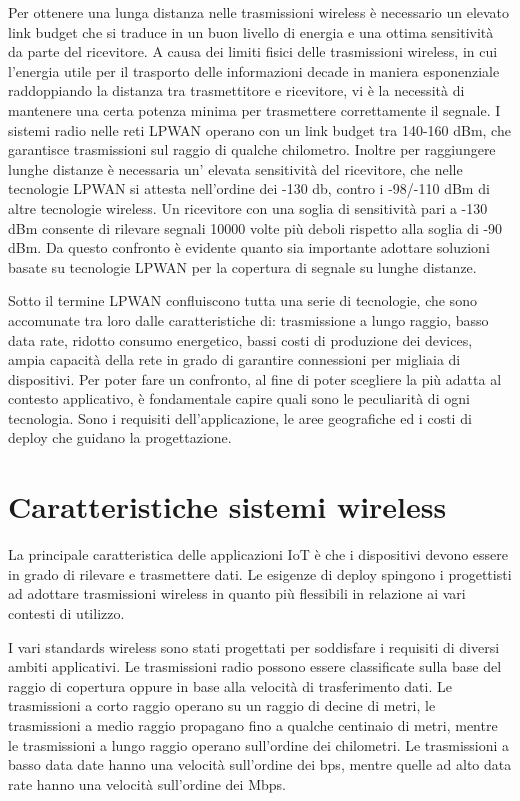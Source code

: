 \documentclass[12pt,a4paper,openright,twoside]{report}
\begin{document}
Per ottenere una lunga distanza nelle trasmissioni wireless \`e necessario un elevato link budget che si traduce in un buon livello di energia e una ottima sensitivit\`a da parte del ricevitore. 
A causa dei limiti fisici delle trasmissioni wireless, in cui l'energia utile per il trasporto delle informazioni decade in maniera esponenziale raddoppiando la distanza tra trasmettitore e ricevitore, vi \`e la necessit\`a di mantenere una certa potenza minima per trasmettere correttamente il segnale. 
I sistemi radio nelle reti LPWAN operano con un link budget tra 140-160 dBm, che garantisce trasmissioni sul raggio di qualche chilometro.
Inoltre per raggiungere lunghe distanze \`e necessaria un' elevata sensitivit\`a del ricevitore, che nelle tecnologie LPWAN si attesta nell'ordine dei -130 db, contro i -98/-110 dBm di altre tecnologie wireless.
Un ricevitore con una soglia di sensitivit\`a pari a -130 dBm consente di rilevare segnali 10000 volte pi\`u deboli rispetto alla soglia di -90 dBm. 
Da questo confronto \`e evidente quanto sia importante adottare soluzioni basate su tecnologie LPWAN per la copertura di segnale su lunghe distanze. 

Sotto il termine LPWAN confluiscono tutta una serie di tecnologie, che sono accomunate tra loro dalle caratteristiche di: trasmissione a lungo raggio, basso data rate, ridotto consumo energetico, bassi costi di produzione dei devices, ampia capacit\`a della rete in grado di garantire connessioni per migliaia di dispositivi.
Per poter fare un confronto, al fine di poter scegliere la pi\`u adatta al contesto applicativo, \`e fondamentale capire quali sono le peculiarit\`a di ogni tecnologia.
Sono i requisiti dell'applicazione, le aree geografiche ed i costi di deploy che guidano la progettazione.


\chapter{Caratteristiche sistemi wireless}                 %
La principale caratteristica delle applicazioni IoT \`e che i dispositivi devono essere in grado di rilevare e trasmettere dati. 
Le esigenze di deploy spingono i progettisti ad adottare trasmissioni wireless in quanto pi\`u flessibili in relazione ai vari contesti di utilizzo.  

I vari standards wireless sono stati progettati per soddisfare i requisiti di diversi ambiti  applicativi.
Le trasmissioni radio possono essere classificate sulla base del raggio di copertura oppure in base alla velocit\`a di trasferimento dati. 
Le trasmissioni a corto raggio operano su un raggio di decine di metri, le trasmissioni a medio raggio propagano fino a qualche centinaio di metri, mentre le trasmissioni a lungo raggio operano sull'ordine dei chilometri.
Le trasmissioni a basso data date hanno una velocit\`a sull'ordine dei bps, mentre quelle ad alto data rate hanno una velocit\`a sull'ordine dei Mbps. 
\end{document}
